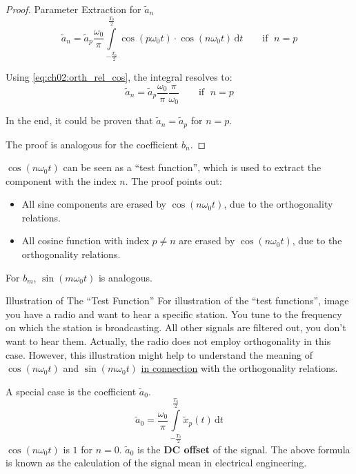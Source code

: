 \begin{refsection}
\begin{proof}{Parameter Extraction for $\tilde{a}_n$}
	\begin{equation}
		\tilde{a}_n = \tilde{a}_p \frac{\omega_0}{\pi} \int\limits_{-\frac{T_0}{2}}^{\frac{T_0}{2}} \cos\left(p \omega_0 t\right) \cdot \cos\left(n \omega_0 t\right) \, \mathrm{d} t \qquad \text{if } \; n = p
	\end{equation}
	
	Using \eqref{eq:ch02:orth_rel_cos}, the integral resolves to:
	\begin{equation}
		\tilde{a}_n = \tilde{a}_p \frac{\omega_0}{\pi} \frac{\pi}{\omega_0} \qquad \text{if } \; n = p
	\end{equation}
	
	In the end, it could be proven that $\tilde{a}_n = \tilde{a}_p$ for $n = p$.
	
	The proof is analogous for the coefficient $b_n$.
\end{proof}

$\cos\left(n \omega_0 t\right)$ can be seen as a ``test function'', which is used to extract the component with the index $n$. The proof points out:
\begin{itemize}
	\item All sine components are erased by $\cos\left(n \omega_0 t\right)$, due to the orthogonality relations.
	\item All cosine function with index $p \neq n$ are erased by $\cos\left(n \omega_0 t\right)$, due to the orthogonality relations.
\end{itemize}
For $b_m$, $\sin\left(m \omega_0 t\right)$ is analogous.

\begin{excursus}{Illustration of The ``Test Function''}
	For illustration of the ``test functions'', image you have a radio and want to hear a specific station. You tune to the frequency on which the station is broadcasting. All other signals are filtered out, you don't want to hear them. Actually, the radio does not employ orthogonality in this case. However, this illustration might help to understand the meaning of $\cos\left(n \omega_0 t\right)$ and $\sin\left(m \omega_0 t\right)$ \underline{in connection} with the orthogonality relations.
\end{excursus}

A special case is the coefficient $\tilde{a}_0$.
\begin{equation}
	\tilde{a}_0 = \frac{\omega_0}{\pi} \int\limits_{-\frac{T_0}{2}}^{\frac{T_0}{2}} \tilde{x}_p(t) \, \mathrm{d} t
\end{equation}
$\cos\left(n \omega_0 t\right)$ is $1$ for $n = 0$. $\tilde{a}_0$ is the  \textbf{\ac{DC} offset} of the signal. The above formula is known as the calculation of the signal mean in electrical engineering.


\end{refsection}
